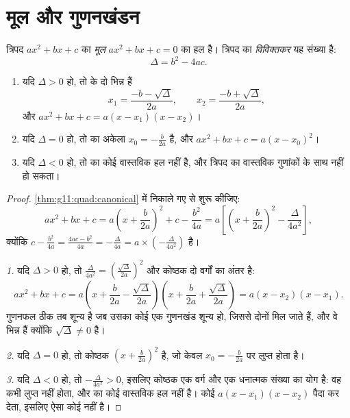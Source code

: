 \section{मूल और गुणनखंडन}

\begin{definition}[मूल, विविक्तकर]\label{def:g11:quad:discriminant}
त्रिपद $ax^2+bx+c$ का \emph{मूल}  $ax^2 + bx + c = 0$ का हल है। त्रिपद का
\emph{विविक्तकर} यह संख्या है:
\[
\Delta = b^2 - 4ac .
\]
\end{definition}

\begin{theorem}[$ax^2+bx+c=0$ को हल करना]\label{thm:g11:quad:roots}
\begin{enumerate}
  \item यदि $\Delta > 0$ हो, तो  के दो भिन्न  हैं
        \[
        x_1 = \frac{-b - \sqrt{\Delta}}{2a},
        \qquad
        x_2 = \frac{-b + \sqrt{\Delta}}{2a},
        \]
        और $ax^2+bx+c = a(x - x_1)(x - x_2)$।
  \item यदि $\Delta = 0$ हो, तो  का अकेला  $x_0 = -\frac{b}{2a}$ है, और $ax^2+bx+c = a(x - x_0)^2$।
  \item यदि $\Delta < 0$ हो, तो  का कोई वास्तविक हल नहीं है, और त्रिपद का
        वास्तविक गुणांकों के साथ  नहीं हो सकता।
\end{enumerate}
\end{theorem}

\begin{proof}
\cref{thm:g11:quad:canonical} में निकाले गए  से शुरू कीजिए:
\[
ax^2+bx+c
= a\left(x + \frac{b}{2a}\right)^2 + c - \frac{b^2}{4a}
= a\left[\left(x + \frac{b}{2a}\right)^2 - \frac{\Delta}{4a^2}\right],
\]
क्योंकि $c - \frac{b^2}{4a} = \frac{4ac - b^2}{4a} = -\frac{\Delta}{4a} =
a \times \left(-\frac{\Delta}{4a^2}\right)$ है।

\emph{1.} यदि $\Delta > 0$ हो, तो $\frac{\Delta}{4a^2} =
\left(\frac{\sqrt\Delta}{2a}\right)^2$ और कोष्ठक दो वर्गों का अंतर है:
\[
ax^2+bx+c = a\left(x + \frac{b}{2a} - \frac{\sqrt\Delta}{2a}\right)
\left(x + \frac{b}{2a} + \frac{\sqrt\Delta}{2a}\right)
= a(x - x_2)(x - x_1).
\]
गुणनफल ठीक तब शून्य है जब उसका कोई एक गुणनखंड शून्य हो, जिससे दोनों  मिल
जाते हैं, और वे भिन्न हैं क्योंकि $\sqrt\Delta \neq 0$ है।

\emph{2.} यदि $\Delta = 0$ हो, तो कोष्ठक $\left(x + \frac{b}{2a}\right)^2$ है, जो केवल $x_0 = -\frac{b}{2a}$ पर लुप्त होता है।

\emph{3.} यदि $\Delta < 0$ हो, तो $-\frac{\Delta}{4a^2} > 0$, इसलिए कोष्ठक एक वर्ग और एक धनात्मक संख्या
का योग है: वह कभी लुप्त नहीं होता, और  का कोई वास्तविक हल नहीं है।
कोई  $a(x-x_1)(x-x_2)$  पैदा कर देता, इसलिए ऐसा कोई  नहीं है।
\end{proof}

